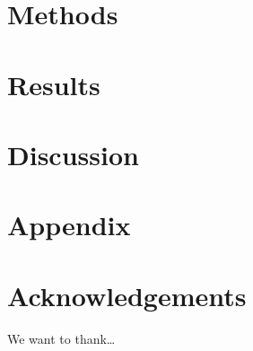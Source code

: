 \documentclass[submit]{smj}
\begin{document}
\section{Methods}

\section{Results}

\section{Discussion}

\section{Appendix}
\section*{Acknowledgements}
We want to thank\ldots





%
%
%
%
%
%
\end{document}
